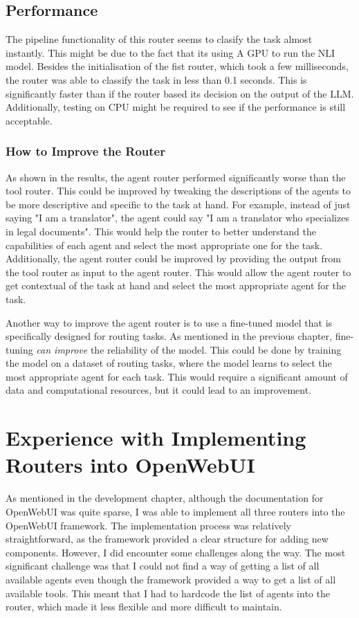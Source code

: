\subsection{Performance}
\label{sec:results-performance}

The pipeline functionality of this router seems to clasify the task almost instantly. This might be due to the fact that its using A GPU to run the NLI model. Besides the initialisation of the fist router, which took a few milliseconds, the router was able to classify the task in less than 0.1 seconds. This is significantly faster than if the router based its decision on the output of the LLM. Additionally, testing on CPU might be required to see if the performance is still acceptable.

\subsubsection{How to Improve the Router}
\label{sec:results-improve-router}

As shown in the results, the agent router performed significantly worse than the tool router. This could be improved by tweaking the descriptions of the agents to be more descriptive and specific to the task at hand. For example, instead of just saying "I am a translator", the agent could say "I am a translator who specializes in legal documents". This would help the router to better understand the capabilities of each agent and select the most appropriate one for the task. Additionally, the agent router could be improved by providing the output from the tool router as input to the agent router. This would allow the agent router to get contextual of the task at hand and select the most appropriate agent for the task.

Another way to improve the agent router is to use a fine-tuned model that is specifically designed for routing tasks. As mentioned in the previous chapter, fine-tuning \textit{can improve} the reliability of the model. This could be done by training the model on a dataset of routing tasks, where the model learns to select the most appropriate agent for each task. This would require a significant amount of data and computational resources, but it could lead to an improvement.

\section{Experience with Implementing Routers into OpenWebUI}
\label{sec:results-implementation}
As mentioned in the development chapter, although the documentation for OpenWebUI was quite sparse, I was able to implement all three routers into the OpenWebUI framework. The implementation process was relatively straightforward, as the framework provided a clear structure for adding new components. However, I did encounter some challenges along the way. The most significant challenge was that I could not find a way of getting a list of all available agents even though the framework provided a way to get a list of all available tools. This meant that I had to hardcode the list of agents into the router, which made it less flexible and more difficult to maintain. 

